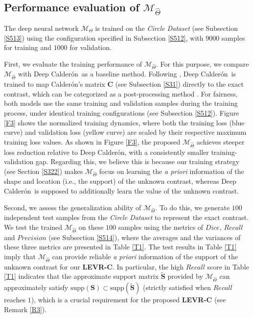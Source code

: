 \documentclass[11pt]{article}
\newcommand{\wit}{\widetilde}
\newcommand{\Calderon}{Calder\'{o}n}
\newcommand{\bds}[1]{\boldsymbol{#1}}
\begin{document}
\subsection{Performance evaluation of $\mathcal{M}_{\widehat{\Theta}}$}\label{S52}

The deep neural network $\mathcal{M}_{\Theta}$ is trained on the \textit{Circle Dataset} (see Subsection \ref{S513}) using the configuration specified in Subsection \ref{S512}, with $ 9000 $ samples for training and $ 1000 $ for validation.

First, we evaluate the training performance of $\mathcal{M}_{\widehat{\Theta}}$.
For this purpose, we compare $\mathcal{M}_{\widehat{\Theta}}$ with Deep \Calderon\ as a baseline method.
Following \cite{CSJ23}, Deep \Calderon\ is trained to map \Calderon's matrix $ \bds{C} $ (see Subsection \ref{S31}) directly to the exact contrast, which can be categorized as a post-processing method \cite{ASM19}.
For fairness, both models use the same training and validation samples during the training process, under identical training configurations (see Subsection \ref{S512}).
Figure \ref{F3} shows the normalized training dynamics, where both the training loss (blue curve) and validation loss (yellow curve) are scaled by their respective maximum training loss values.
As shown in Figure \ref{F3}, the proposed $ \mathcal{M}_{\widehat{\Theta}} $ achieves steeper loss reduction relative to Deep \Calderon, with a consistently smaller training-validation gap.
Regarding this, we believe this is because our training strategy (see Section \ref{S322}) makes $ \mathcal{M}_{\widehat{\Theta}} $ focus on learning the \textit{a priori} information of the shape and location (i.e., the support) of the unknown contrast, whereas Deep \Calderon\ is supposed to additionally learn the value of the unknown contrast. 

Second, we assess the generalization ability of $\mathcal{M}_{\widehat{\Theta}}$.
To do this, we generate $ 100 $ independent test samples from the \textit{Circle Dataset} to represent the exact contrast.
We test the trained $\mathcal{M}_{\widehat{\Theta}}$ on these $ 100 $ samples using the metrics of $ Dice $, $ Recall $ and $ Precision $ (see Subsection \ref{S514}), where the averages and the variances of these three metrics are presented in Table \ref{T1}.
The test results in Table \ref{T1} imply that $\mathcal{M}_{\widehat{\Theta}}$ can provide reliable \textit{a priori} information of the support of the unknown contrast for our \textbf{LEVR-C}.
In particular, the high $ Recall $ score in Table \ref{T1} indicates that the approximate support matrix $ \wit{\bds{S}} $ provided by $\mathcal{M}_{\widehat{\Theta}}$ can approximately satisfy $ \mathrm{supp}(\bds{S})\subset\mathrm{supp}(\wit{\bds{S}}) $ (strictly satisfied when $ Recall $ reaches $ 1 $), which is a crucial requirement for the proposed \textbf{LEVR-C} (see Remark \ref{R3}).
\end{document}
